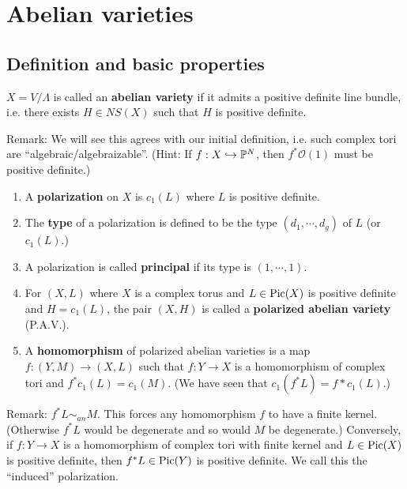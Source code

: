 



\section{Abelian varieties}\label{Chapters/abelianvarieties}

\subsection{Definition and basic properties}

\begin{definition}
$X=V/\Lambda$ is called an \textbf{abelian variety} if it admits a positive definite line bundle, i.e. there exists $H\in NS(X)$ such that $H$ is positive definite. 
\end{definition}

Remark: We will see this agrees with our initial definition, i.e. such complex tori are ``algebraic/algebraizable''. (Hint: If $f:X\hookrightarrow {\mathbb P}^N$, then $f^*\mathcal{O}(1)$ must be positive definite.)

\begin{definition}
\noindent
\begin{enumerate}
\item A \textbf{polarization} on $X$ is $c_1(L)$ where $L$ is positive definite.
\item The \textbf{type} of a polarization is defined to be the type $(d_1,\cdots, d_g)$ of $L$ (or $c_1(L)$.)
\item A polarization is called \textbf{principal} if its type is $(1,\cdots, 1)$. 
\item For $(X,L)$ where $X$ is a complex torus and $L\in \operatorname{Pic}(X)$ is positive definite and $H=c_1(L)$, the pair $(X,H)$ is called a \textbf{polarized abelian variety} (P.A.V.).
\item A \textbf{homomorphism} of polarized abelian varieties is a map $f:(Y,M)\to (X,L)$ such that $f:Y\to X$ is a homomorphism of complex tori and $f^* c_1(L)=c_1(M)$. (We have seen that $c_1(f^*L)=f* c_1(L)$.)
\end{enumerate}
\end{definition}

Remark: 
$f^*L\sim_{an} M$. This forces any homomorphism $f$ to have a finite kernel. (Otherwise $f^*L$ would be degenerate and so would $M$ be degenerate.) Conversely, if $f:Y\to X$ is a homomorphism of complex tori with finite kernel and $L\in \operatorname{Pic}(X)$ is positive definite, then $f^*L\in \operatorname{Pic}(Y)$ is positive definite. We call this the ``induced'' polarization. 


